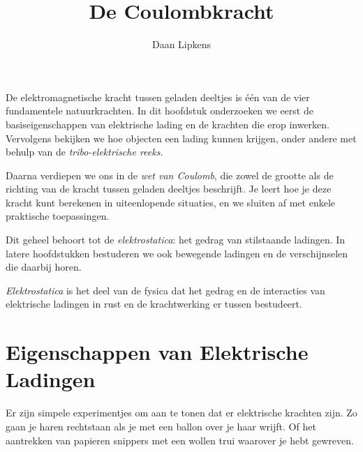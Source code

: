 % 




    \author{Daan Lipkens}
	 \title{De Coulombkracht}
	 \begin{abstract}\end{abstract}
	 \maketitle
De elektromagnetische kracht tussen geladen deeltjes is één van de vier fundamentele natuurkrachten. In dit hoofdstuk onderzoeken we eerst de basiseigenschappen van elektrische lading en de krachten die erop inwerken. Vervolgens bekijken we hoe objecten een lading kunnen krijgen, onder andere met behulp van de \emph{tribo-elektrische reeks}.

Daarna verdiepen we ons in de \emph{wet van Coulomb}, die zowel de grootte als de richting van de kracht tussen geladen deeltjes beschrijft. Je leert hoe je deze kracht kunt berekenen in uiteenlopende situaties, en we sluiten af met enkele praktische toepassingen.

Dit geheel behoort tot de \emph{elektrostatica}: het gedrag van stilstaande ladingen. In latere hoofdstukken bestuderen we ook bewegende ladingen en de verschijnselen die daarbij horen.
\begin{definitie}
\emph{Elektrostatica} is het deel van de fysica dat het gedrag en de interacties van elektrische ladingen in rust en de krachtwerking er tussen bestudeert.
\end{definitie}


\section{Eigenschappen van Elektrische Ladingen}
Er zijn simpele experimentjes om aan te tonen dat er elektrische krachten zijn. Zo gaan je haren rechtstaan als je met een ballon over je haar wrijft. Of het aantrekken van papieren snippers met een wollen trui waarover je hebt gewreven.
\begin{marginfigure}
	\begin{center}
	\end{center}
	\vspace*{-5mm}
	\caption*{{\scriptsize  Link naar video met het aantrekken van papiersnippers.}}
\end{marginfigure}

